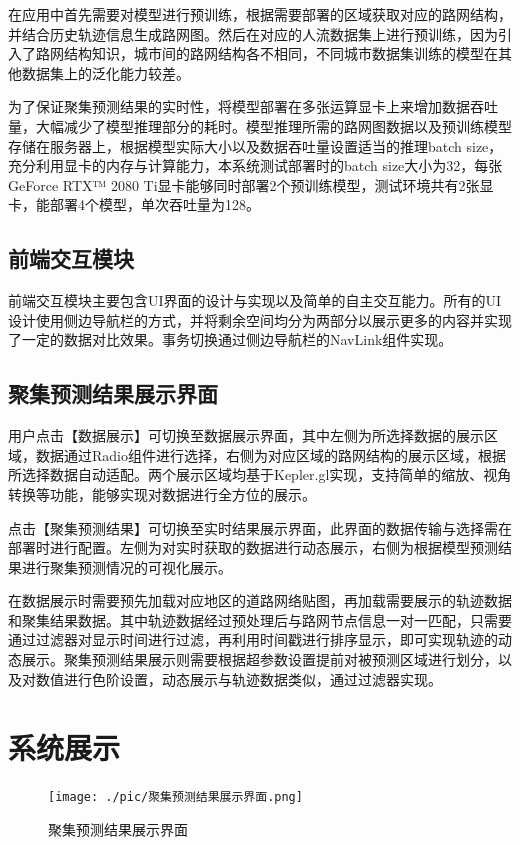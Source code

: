 \documentclass[master]{thesis-uestc}
\begin{document}
在应用中首先需要对模型进行预训练，根据需要部署的区域获取对应的路网结构，并结合历史轨迹信息生成路网图。然后在对应的人流数据集上进行预训练，因为引入了路网结构知识，城市间的路网结构各不相同，不同城市数据集训练的模型在其他数据集上的泛化能力较差。

为了保证聚集预测结果的实时性，将模型部署在多张运算显卡上来增加数据吞吐量，大幅减少了模型推理部分的耗时。模型推理所需的路网图数据以及预训练模型存储在服务器上，根据模型实际大小以及数据吞吐量设置适当的推理batch size，充分利用显卡的内存与计算能力，本系统测试部署时的batch size大小为32，每张GeForce RTX™ 2080 Ti显卡能够同时部署2个预训练模型，测试环境共有2张显卡，能部署4个模型，单次吞吐量为128。

\subsection{前端交互模块}
前端交互模块主要包含UI界面的设计与实现以及简单的自主交互能力。所有的UI设计使用侧边导航栏的方式，并将剩余空间均分为两部分以展示更多的内容并实现了一定的数据对比效果。事务切换通过侧边导航栏的NavLink组件实现。

\subsection{聚集预测结果展示界面}
用户点击【数据展示】可切换至数据展示界面，其中左侧为所选择数据的展示区域，数据通过Radio组件进行选择，右侧为对应区域的路网结构的展示区域，根据所选择数据自动适配。两个展示区域均基于Kepler.gl实现，支持简单的缩放、视角转换等功能，能够实现对数据进行全方位的展示。

点击【聚集预测结果】可切换至实时结果展示界面，此界面的数据传输与选择需在部署时进行配置。左侧为对实时获取的数据进行动态展示，右侧为根据模型预测结果进行聚集预测情况的可视化展示。

在数据展示时需要预先加载对应地区的道路网络贴图，再加载需要展示的轨迹数据和聚集结果数据。其中轨迹数据经过预处理后与路网节点信息一对一匹配，只需要通过过滤器对显示时间进行过滤，再利用时间戳进行排序显示，即可实现轨迹的动态展示。聚集预测结果展示则需要根据超参数设置提前对被预测区域进行划分，以及对数值进行色阶设置，动态展示与轨迹数据类似，通过过滤器实现。

\section{系统展示}

\begin{figure}[!ht]
\centering
\texttt{[image: ./pic/聚集预测结果展示界面.png]}
\caption{聚集预测结果展示界面}
\label{Figure.5.8}
\end{figure}
\end{document}
